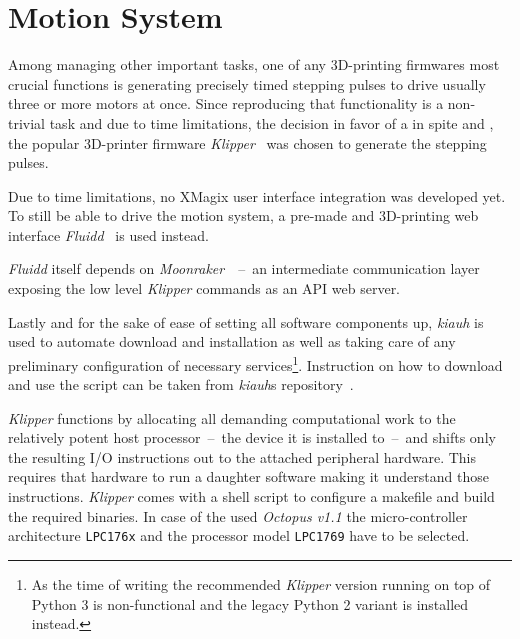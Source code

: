     \section{Motion System}
        Among managing other important tasks, one of any 3D-printing firmwares most crucial functions is generating precisely timed stepping pulses to drive usually three or more motors at once.
        Since reproducing that functionality is a non-trivial task and due to  time limitations, the decision in favor of a in spite  and , the popular 3D-printer firmware \textit{Klipper}~\cite{Software.Klipper.2023} was chosen to generate the stepping pulses.
        
        Due to time limitations, no XMagix user interface integration was developed yet.
        To still be able to drive the motion system, a pre-made and 3D-printing web interface \textit{Fluidd}~\cite{Software.FluiddTheKlipperUI} is used instead.
        
        \textit{Fluidd} itself depends on \textit{Moonraker}~\cite{Software.MoonrakerAPIWebServerForKlipper.2023}~--~an intermediate communication layer exposing the low level \textit{Klipper} commands as an API web server.\par\medskip

        Lastly and for the sake of ease of setting all software components up, \textit{kiauh} is used to automate download and installation as well as taking care of any preliminary configuration of necessary services\footnote{As the time of writing the recommended \textit{Klipper} version running on top of Python 3 is non-functional and the legacy Python 2 variant is installed instead.}. Instruction on how to download and use the script can be taken from \textit{kiauh}s repository~\cite{Software.KlipperInstallationAndUpdateHelper.2023}.\par\medskip

        \textit{Klipper} functions by allocating all demanding computational work to the relatively potent host processor~--~the device it is installed to~--~and shifts only the resulting I/O instructions out to the attached peripheral hardware.
        This requires that hardware to run a daughter software making it understand those instructions.
        \textit{Klipper} comes with a shell script to configure a makefile and build the required binaries.
        In case of the used \textit{Octopus v1.1} the micro-controller architecture \texttt{LPC176x} and the processor model \texttt{LPC1769} have to be selected.

